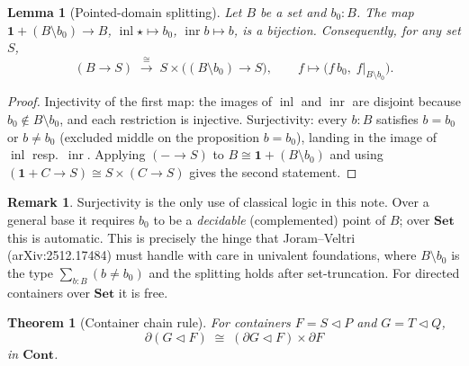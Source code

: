 \documentclass[11pt]{article}
\newtheorem{theorem}{Theorem}
\newtheorem{lemma}{Lemma}
\theoremstyle{definition}
\newtheorem{remark}{Remark}
\newcommand{\Set}{\mathbf{Set}}
\newcommand{\Cont}{\mathbf{Cont}}
\newcommand{\tri}{\mathbin{\triangleleft}}
\newcommand{\pd}{\partial}
\DeclareMathOperator{\inl}{inl}
\DeclareMathOperator{\inr}{inr}
\begin{document}
\begin{lemma}[Pointed-domain splitting]\label{lem:pointed}
Let $B$ be a set and $b_0 : B$. The map
$\mathbf 1 + (B\setminus b_0) \to B$, $\inl\star \mapsto b_0$,
$\inr b \mapsto b$, is a bijection. Consequently, for any set $S$,
\[
  (B \to S) \;\xrightarrow{\;\cong\;}\; S \times \bigl((B\setminus b_0) \to S\bigr),
  \qquad f \mapsto \bigl(f\,b_0,\; f|_{B\setminus b_0}\bigr).
\]
\end{lemma}
\begin{proof}
Injectivity of the first map: the images of $\inl$ and $\inr$ are disjoint
because $b_0 \notin B\setminus b_0$, and each restriction is injective.
Surjectivity: every $b:B$ satisfies $b = b_0$ or $b \neq b_0$ (excluded middle
on the proposition $b = b_0$), landing in the image of $\inl$ resp.\ $\inr$.
Applying $(-\to S)$ to $B \cong \mathbf 1 + (B\setminus b_0)$ and using
$(\mathbf 1 + C \to S) \cong S \times (C\to S)$ gives the second statement.
\end{proof}

\begin{remark}
Surjectivity is the only use of classical logic in this note. Over a general
base it requires $b_0$ to be a \emph{decidable} (complemented) point of $B$;
over $\Set$ this is automatic. This is precisely the hinge that Joram--Veltri
(arXiv:2512.17484) must handle with care in univalent foundations, where
$B\setminus b_0$ is the type $\sum_{b:B}(b \neq b_0)$ and the splitting holds
after set-truncation. For directed containers over $\Set$ it is free.
\end{remark}

\begin{theorem}[Container chain rule]\label{thm:chain}
For containers $F = S \tri P$ and $G = T \tri Q$,
\[
  \pd(G \tri F) \;\cong\; (\pd G \tri F) \times \pd F
\]
in $\Cont$.
\end{theorem}
\end{document}
